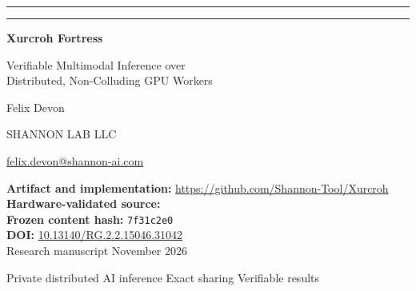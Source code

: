 \begin{titlepage}
\centering
\vspace*{9mm}
{\color{xteal}\rule{0.22\linewidth}{2pt}}\hfill{\color{xblue}\rule{0.72\linewidth}{2pt}}

\vspace{15mm}
{\Huge\bfseries\color{xink}Xurcroh Fortress\par}
\vspace{5mm}
{\LARGE\color{xblue}Verifiable Multimodal Inference over\\Distributed, Non-Colluding GPU Workers\par}
\vspace{10mm}
{\Large Felix Devon\par}
\vspace{2mm}
{\large SHANNON LAB LLC\par}
\vspace{2mm}
\href{mailto:felix.devon@shannon-ai.com}{felix.devon@shannon-ai.com}\par
\vspace{10mm}
\begin{tcolorbox}[colback=xpale,colframe=xline,width=0.88\linewidth,arc=2pt]
\centering
\small
\textbf{Artifact and implementation:} \url{https://github.com/Shannon-Tool/Xurcroh}\\[2pt]
\textbf{Hardware-validated source:} \frozenbuild\\
\textbf{Frozen content hash:} \texttt{7f31c2e0}\\[2pt]
\textbf{DOI:} \href{https://doi.org/10.13140/RG.2.2.15046.31042}{10.13140/RG.2.2.15046.31042}\\[2pt]
Research manuscript \textbullet{} November 2026
\end{tcolorbox}
\vfill
{\small\color{xmuted}Private distributed AI inference \textbullet{} Exact sharing \textbullet{} Verifiable results}
\end{titlepage}

